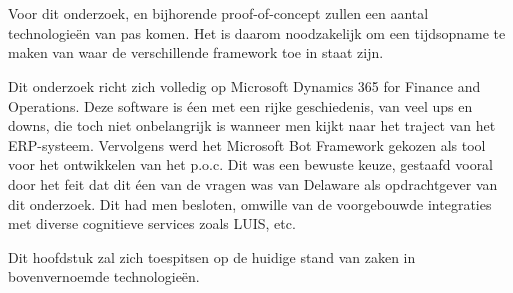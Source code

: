 \chapter{}
\label{ch:stand-van-zaken}
Voor dit onderzoek, en bijhorende proof-of-concept zullen een aantal technologieën van pas komen. Het is daarom noodzakelijk om een tijdsopname te maken van waar de verschillende framework toe in staat zijn. 

Dit onderzoek richt zich volledig op Microsoft Dynamics 365 for Finance and Operations. Deze software is éen met een rijke geschiedenis, van veel ups en downs, die toch niet onbelangrijk is wanneer men kijkt naar het traject van het ERP-systeem. 
Vervolgens werd het Microsoft Bot Framework gekozen als tool voor het ontwikkelen van het p.o.c. Dit was een bewuste keuze, gestaafd vooral door het feit dat dit éen van de vragen was van Delaware als opdrachtgever van dit onderzoek. Dit had men besloten, omwille van de voorgebouwde integraties met diverse cognitieve services zoals LUIS, etc.

Dit hoofdstuk zal zich toespitsen op de huidige stand van zaken in bovenvernoemde technologieën.  

